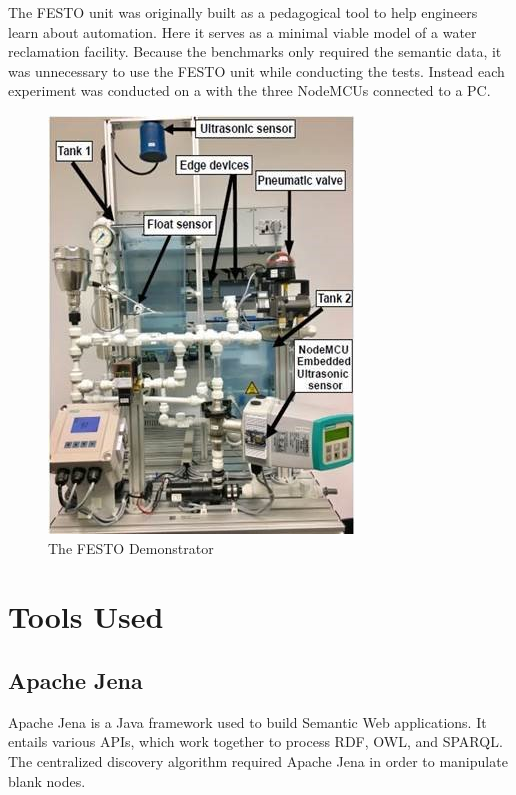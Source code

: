 The FESTO unit was originally built as a pedagogical tool to help engineers learn about automation. Here it serves as a minimal viable model of a water reclamation facility. Because the benchmarks only required the semantic data, it was unnecessary to use the FESTO unit while conducting the tests. Instead each experiment was conducted on a with the three NodeMCUs connected to a PC.

\begin{figure}[th]
\centering
\includegraphics[width=.7\textwidth]{Figures/festoDemonstrator.jpg}
\caption{The FESTO Demonstrator}
\label{fig:festoDem}
\end{figure}



\section{Tools Used}



\subsection{Apache Jena}

Apache Jena is a Java framework used to build Semantic Web applications. It entails various APIs, which work together to process RDF, OWL, and SPARQL. The centralized discovery algorithm required Apache Jena in order to manipulate blank nodes.

